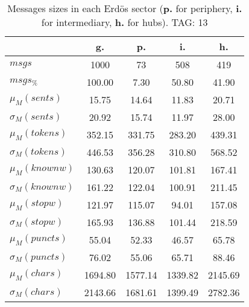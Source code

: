 \begin{table}[h!]
\begin{center}
\begin{tabular}{| l | c | c | c | c |}\hline
 & g. & p. & i. & h. \\\hline
$msgs$ & 1000  & 73  & 508  & 419 \\\hline
$msgs_{\%}$ & 100.00  & 7.30  & 50.80  & 41.90 \\\hline
$\mu_M(sents)$ & 15.75  & 14.64  & 11.83  & 20.71 \\\hline
$\sigma_M(sents)$ & 20.92  & 15.74  & 11.97  & 28.00 \\\hline
$\mu_M(tokens)$ & 352.15  & 331.75  & 283.20  & 439.31 \\\hline
$\sigma_M(tokens)$ & 446.53  & 356.28  & 310.80  & 568.52 \\\hline
$\mu_M(knownw)$ & 130.63  & 120.07  & 101.81  & 167.41 \\\hline
$\sigma_M(knownw)$ & 161.22  & 122.04  & 100.91  & 211.45 \\\hline
$\mu_M(stopw)$ & 121.97  & 115.07  & 94.01  & 157.08 \\\hline
$\sigma_M(stopw)$ & 165.93  & 136.88  & 101.44  & 218.59 \\\hline
$\mu_M(puncts)$ & 55.04  & 52.33  & 46.57  & 65.78 \\\hline
$\sigma_M(puncts)$ & 76.02  & 55.06  & 65.71  & 88.46 \\\hline
$\mu_M(chars)$ & 1694.80  & 1577.14  & 1339.82  & 2145.69 \\\hline
$\sigma_M(chars)$ & 2143.66  & 1681.61  & 1399.49  & 2782.36 \\\hline
\end{tabular}
\caption{Messages sizes in each Erd\"os sector ({{\bf p.}} for periphery, {{\bf i.}} for intermediary, {{\bf h.}} for hubs). TAG: 13}
\end{center}
\end{table}